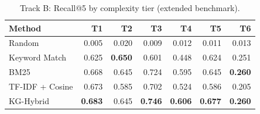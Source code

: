 \begin{table}[t]
\centering
\caption{Track B: Recall@5 by complexity tier (extended benchmark).}
\label{tab:extended-per-tier}
\begin{tabular}{lrrrrrr}
\toprule
Method & T1 & T2 & T3 & T4 & T5 & T6 \\
\midrule
Random & 0.005 & 0.020 & 0.009 & 0.012 & 0.011 & 0.013 \\
Keyword Match & 0.625 & \textbf{0.650} & 0.601 & 0.448 & 0.624 & 0.251 \\
BM25 & 0.668 & 0.645 & 0.724 & 0.595 & 0.645 & \textbf{0.260} \\
TF-IDF + Cosine & 0.673 & 0.585 & 0.702 & 0.524 & 0.586 & 0.205 \\
KG-Hybrid & \textbf{0.683} & 0.645 & \textbf{0.746} & \textbf{0.606} & \textbf{0.677} & \textbf{0.260} \\
\bottomrule
\end{tabular}
\end{table}